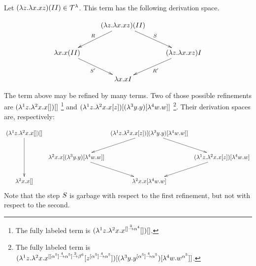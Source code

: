 \begin{example}
Let $(\lambda z. \lambda x. x z) (I I) \in \mathcal{T}^{\lambda}$.
This term has the following derivation space.

\[
\xymatrix{
  & (\lam{\varthree}{\lam{\var}{\var \varthree}}) (I I) \ar[dl]_{\redex} \ar[dr]^{\redextwo}
  &
  \\
  \lam{\var}{\var (I I)} \ar[dr]_{\redextwo'}
  &
  & (\lam{\varthree}{\lam{\var}{\var \varthree}}) I \ar[dl]^{\redex'}
  \\
  & \lam{\var}{\var I}
  &
  \\
}
\]

The term above may be refined by many terms. Two of those possible refinements are
$(\lambda^{1} z. \lambda^{2} x. x []) []$
\footnote{
The fully labeled term is
$(\lambda^{1} z. \lambda^{2} x. x^{[] \overset{3}{\to} \alpha^4} []) []$.
}
and
$(\lambda^{1} z. \lambda^{2} x. x [z]) [(\lambda^{3} y. y) [\lambda^{4} w. w]]$
\footnote{
The fully labeled term is
$(\lambda^{1} z. 
   \lambda^{2} x. 
     x^{[[\alpha^5] \overset{4}{\to} \alpha^5] \overset{2}{\to} \beta^6}
     [z^{[\alpha^5] \overset{4}{\to} \alpha^5}]
  )
  [(\lambda^{3} y. y^{[\alpha^5] \overset{4}{\to} \alpha^5}) [\lambda^{4} w. w^{\alpha^5}]]$.
}.
Their derivation spaces are, respectively:

{\small
\[
\xymatrix@C=.15cm{
  (\lamp{1}{\varthree}{\lamp{2}{\var}{\var []}}) []
  \ar[dd]
  &
  & (\lamp{1}{\varthree}{\lamp{2}{\var}{\var [\varthree]}}) [(\lamp{3}{\vartwo}{\vartwo}) [\lamp{4}{w}{w}]]
  \ar[dl]
  \ar[dr]
  &
  \\
  & \lamp{2}{\var}{\var [(\lamp{3}{\vartwo}{\vartwo}) [\lamp{4}{w}{w}]]}
  \ar[dr]
  &
  & (\lamp{1}{\varthree}{\lamp{2}{\var}{\var [\varthree]}}) [\lamp{4}{w}{w}]
  \ar[dl]
  \\
  \lamp{2}{\var}{\var []}
  &
  & \lamp{2}{\var}{\var [\lamp{4}{w}{w}]}
  &
  \\
}
\]
}
Note that the step $S$ is garbage with respect to the first refinement,
but not with respect to the second.
\end{example}

